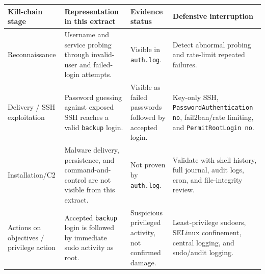 \documentclass[10pt,a4paper]{article}
\begin{document}
\begin{center}
\scriptsize
\begin{tabularx}{\linewidth}{L{2.4cm}Y L{2.35cm}L{3.0cm}}
\toprule
Kill-chain stage & Representation in this extract & Evidence status & Defensive interruption \\
\midrule
Reconnaissance & Username and service probing through invalid-user and failed-login attempts. & Visible in \texttt{auth.log}. & Detect abnormal probing and rate-limit repeated failures. \\
Delivery / SSH exploitation & Password guessing against exposed SSH reaches a valid \texttt{backup} login. & Visible as failed passwords followed by accepted login. & Key-only SSH, \texttt{PasswordAuthentication no}, fail2ban/rate limiting, and \texttt{PermitRootLogin no}. \\
Installation/C2 & Malware delivery, persistence, and command-and-control are not visible from this extract. & Not proven by \texttt{auth.log}. & Validate with shell history, full journal, audit logs, cron, and file-integrity review. \\
Actions on objectives / privilege action & Accepted \texttt{backup} login is followed by immediate sudo activity as root. & Suspicious privileged activity, not confirmed damage. & Least-privilege sudoers, SELinux confinement, central logging, and sudo/audit logging. \\
\bottomrule
\end{tabularx}
\end{center}
\end{document}
